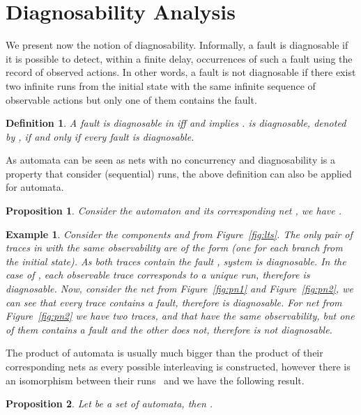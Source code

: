\documentclass[a4paper]{article}
\newtheorem{exmp}{Example}
\newtheorem{prop}{Proposition}
\newtheorem{defn}{Definition}
\begin{document}
\section{Diagnosability Analysis} \label{sec:diag}

We present now the notion of diagnosability. Informally, a fault  is diagnosable if it is possible to detect, within a finite delay, occurrences of such a fault using the record of observed actions. In other words, a fault is not diagnosable if there exist two infinite runs from the initial state with the same infinite sequence of observable actions but only one of them contains the fault.

\begin{defn}
  A fault  is diagnosable in  iff  and  implies .  is diagnosable, denoted by , if and only if every fault  is diagnosable.
\end{defn}

As automata can be seen as nets with no concurrency and diagnosability is a property that consider (sequential) runs, the above definition can also be applied for automata.

\begin{prop}
 Consider the automaton  and its corresponding net , we have .
\end{prop}

\begin{exmp}
  Consider the components  and  from Figure~\ref{fig:lts}. The only pair of traces in  with the same observability are of the form  (one for each branch from the initial state). As both traces contain the fault , system  is diagnosable. In the case of , each observable trace corresponds to a unique run, therefore  is diagnosable. Now, consider the net  from Figure~\ref{fig:pn1} and Figure~\ref{fig:pn2}, we can see that every trace contains a fault, therefore  is diagnosable. For net  from Figure~\ref{fig:pn2} we have two traces,  and  that have the same observability, but one of them contains a fault and the other does not, therefore  is not diagnosable.
  \label{ex:one}
\end{exmp}

The product of automata is usually much bigger than the product of their corresponding nets as every possible interleaving is constructed, however there is an isomorphism between their runs~\cite{runs_prod} and we have the following result.

\begin{prop}
  Let  be a set of automata, then .
\end{prop}
\end{document}
